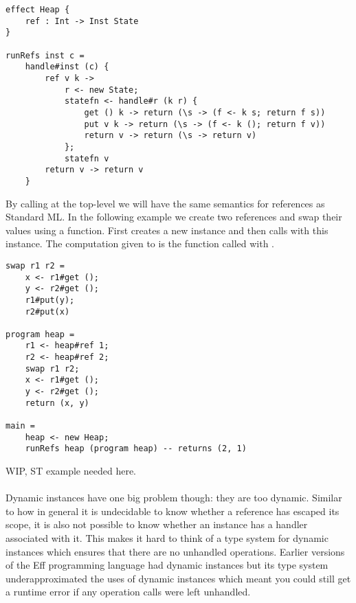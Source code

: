 \begin{verbatim}
effect Heap {
	ref : Int -> Inst State
}

runRefs inst c =
	handle#inst (c) {
		ref v k ->
			r <- new State;
			statefn <- handle#r (k r) {
				get () k -> return (\s -> (f <- k s; return f s))
				put v k -> return (\s -> (f <- k (); return f v))
				return v -> return (\s -> return v)
			};
			statefn v 
		return v -> return v
	}
\end{verbatim}

By calling  at the top-level we will have the same semantics for references as Standard ML.
In the following example we create two references and swap their values using a  function.
First  creates a new  instance  and then calls  with this instance.
The computation given to  is the function  called with .

\begin{verbatim}
swap r1 r2 =
	x <- r1#get ();
	y <- r2#get ();
	r1#put(y);
	r2#put(x)
	
program heap =
	r1 <- heap#ref 1;
	r2 <- heap#ref 2;
	swap r1 r2;
	x <- r1#get ();
	y <- r2#get ();
	return (x, y)
	
main =
	heap <- new Heap;
	runRefs heap (program heap) -- returns (2, 1)
\end{verbatim}

WIP, ST example needed here.
\\\\
Dynamic instances have one big problem though: they are too dynamic. Similar to how in general it is undecidable to know whether a reference has escaped its scope, it is also not possible to know whether an instance has a handler associated with it. This makes it hard to think of a type system for dynamic instances which ensures that there are no unhandled operations. Earlier versions of the Eff programming language\cite{eff1} had dynamic instances but its type system underapproximated the uses of dynamic instances which meant you could still get a runtime error if any operation calls were left unhandled.
